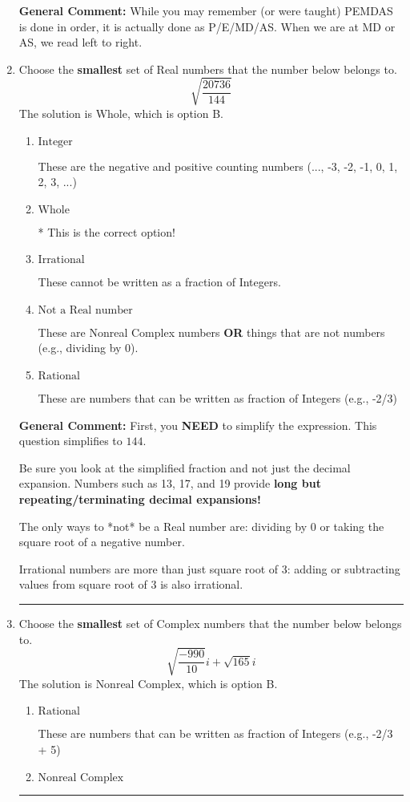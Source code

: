\documentclass{extbook}[14pt]
\newcommand{\litem}[1]{\item #1

\rule{\textwidth}{0.4pt}}
\begin{document}
\begin{enumerate}
{\textbf{General Comment:} While you may remember (or were taught) PEMDAS is done in order, it is actually done as P/E/MD/AS. When we are at MD or AS, we read left to right.
}
\litem{
Choose the \textbf{smallest} set of Real numbers that the number below belongs to.
\[ \sqrt{\frac{20736}{144}} \]The solution is \( \text{Whole} \), which is option B.\begin{enumerate}[label=\Alph*.]
\item \( \text{Integer} \)

These are the negative and positive counting numbers (..., -3, -2, -1, 0, 1, 2, 3, ...)
\item \( \text{Whole} \)

* This is the correct option!
\item \( \text{Irrational} \)

These cannot be written as a fraction of Integers.
\item \( \text{Not a Real number} \)

These are Nonreal Complex numbers \textbf{OR} things that are not numbers (e.g., dividing by 0).
\item \( \text{Rational} \)

These are numbers that can be written as fraction of Integers (e.g., -2/3)
\end{enumerate}

\textbf{General Comment:} First, you \textbf{NEED} to simplify the expression. This question simplifies to $144$. 
 
 Be sure you look at the simplified fraction and not just the decimal expansion. Numbers such as 13, 17, and 19 provide \textbf{long but repeating/terminating decimal expansions!} 
 
 The only ways to *not* be a Real number are: dividing by 0 or taking the square root of a negative number. 
 
 Irrational numbers are more than just square root of 3: adding or subtracting values from square root of 3 is also irrational.
}
\litem{
Choose the \textbf{smallest} set of Complex numbers that the number below belongs to.
\[ \sqrt{\frac{-990}{10}} i+\sqrt{165}i \]The solution is \( \text{Nonreal Complex} \), which is option B.\begin{enumerate}[label=\Alph*.]
\item \( \text{Rational} \)

These are numbers that can be written as fraction of Integers (e.g., -2/3 + 5)
\item \( \text{Nonreal Complex} \)


\end{enumerate}}
\end{enumerate}
\end{document}
